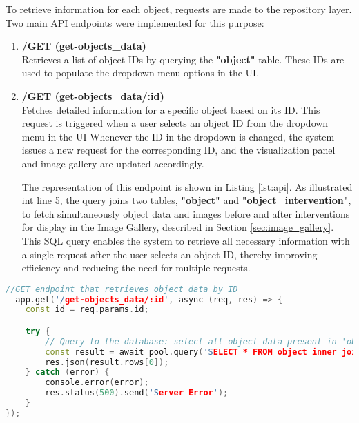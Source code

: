 To retrieve information for each object, requests are made to the repository layer. 
Two main \gls{API} endpoints were implemented for this purpose:

\begin{enumerate}
  \item \textbf{/GET (get-objects\_data)}
  \\Retrieves a list of object IDs by querying the \textbf{"object"} table. These IDs are used to populate the dropdown menu options in the \gls{UI}.

  \item \textbf{/GET (get-objects\_data/:id)}
  \\Fetches detailed information for a specific object based on its ID. This request is triggered when a user selects an object ID from the dropdown menu in the \gls{UI}
  Whenever the ID in the dropdown is changed, the system issues a new request for the corresponding ID, and the visualization panel and image gallery are updated accordingly.

  The representation of this endpoint is shown in Listing \ref{lst:api}. As illustrated int line 5, the query joins two tables, \textbf{"object"} and \textbf{"object\_intervention"}, to fetch simultaneously object data and images before and after interventions for display in the Image Gallery, described in Section \ref{sec:image_gallery}. 
  This SQL query enables the system to retrieve all necessary information with a single request after the user selects an object ID, thereby improving efficiency and reducing the need for multiple requests.

\end{enumerate}

\begin{lstlisting}[language=C++, caption={Example of defining an \gls{API} endpoint in Node.js.},label={lst:api}]
  //GET endpoint that retrieves object data by ID
  app.get('/get-objects_data/:id', async (req, res) => {
    const id = req.params.id;

    try {
        // Query to the database: select all object data present in 'object' and 'object_intervention' tables by ID
        const result = await pool.query('SELECT * FROM object inner join object_intervention on object.id = object_intervention.object_id WHERE object.id = $1', [id]);
        res.json(result.rows[0]);
    } catch (error) {
        console.error(error);
        res.status(500).send('Server Error');
    }
});
\end{lstlisting}



